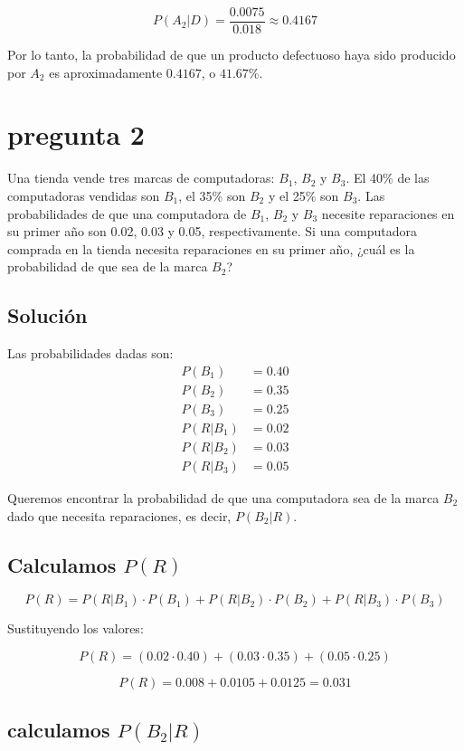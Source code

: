 \documentclass[12pt,a4paper]{article}
\begin{document}
\[
P(A_2|D) = \frac{0.0075}{0.018} \approx 0.4167
\]

Por lo tanto, la probabilidad de que un producto defectuoso haya sido producido por \( A_2 \) es aproximadamente \( 0.4167 \), o \( 41.67\% \).\\




\section*{pregunta 2}
Una tienda vende tres marcas de computadoras: \( B_1 \), \( B_2 \) y \( B_3 \). El 40\% de las computadoras vendidas son \( B_1 \), el 35\% son \( B_2 \) y el 25\% son \( B_3 \). Las probabilidades de que una computadora de \( B_1 \), \( B_2 \) y \( B_3 \) necesite reparaciones en su primer año son 0.02, 0.03 y 0.05, respectivamente. Si una computadora comprada en la tienda necesita reparaciones en su primer año, ¿cuál es la probabilidad de que sea de la marca \( B_2 \)?

\subsection*{Solución}

Las probabilidades dadas son:
\begin{align*}
P(B_1) &= 0.40 \\
P(B_2) &= 0.35 \\
P(B_3) &= 0.25 \\
P(R|B_1) &= 0.02 \\
P(R|B_2) &= 0.03 \\
P(R|B_3) &= 0.05
\end{align*}

Queremos encontrar la probabilidad de que una computadora sea de la marca \( B_2 \) dado que necesita reparaciones, es decir, \( P(B_2|R) \).

\subsection*{Calculamos \( P(R) \)}

\[
P(R) = P(R|B_1) \cdot P(B_1) + P(R|B_2) \cdot P(B_2) + P(R|B_3) \cdot P(B_3)
\]

Sustituyendo los valores:

\[
P(R) = (0.02 \cdot 0.40) + (0.03 \cdot 0.35) + (0.05 \cdot 0.25) 
\]

\[
P(R) = 0.008 + 0.0105 + 0.0125 = 0.031
\]

\subsection*{calculamos \( P(B_2|R) \)}
\end{document}
